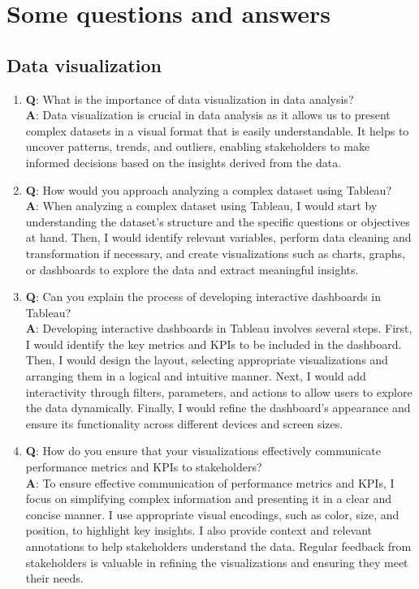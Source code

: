 \chapter{Some questions and answers}

\section{Data visualization}

\begin{enumerate}
	\item \textbf{Q}: What is the importance of data visualization in data analysis? \\
	\textbf{A}: Data visualization is crucial in data analysis as it allows us to present complex datasets in a visual format that is easily understandable. It helps to uncover patterns, trends, and outliers, enabling stakeholders to make informed decisions based on the insights derived from the data.
	
	\item \textbf{Q}: How would you approach analyzing a complex dataset using Tableau?\\
	\textbf{A}: When analyzing a complex dataset using Tableau, I would start by understanding the dataset's structure and the specific questions or objectives at hand. Then, I would identify relevant variables, perform data cleaning and transformation if necessary, and create visualizations such as charts, graphs, or dashboards to explore the data and extract meaningful insights.
	
	\item \textbf{Q}: Can you explain the process of developing interactive dashboards in Tableau? \\
	\textbf{A}: Developing interactive dashboards in Tableau involves several steps. First, I would identify the key metrics and KPIs to be included in the dashboard. Then, I would design the layout, selecting appropriate visualizations and arranging them in a logical and intuitive manner. Next, I would add interactivity through filters, parameters, and actions to allow users to explore the data dynamically. Finally, I would refine the dashboard's appearance and ensure its functionality across different devices and screen sizes.
	
	\item \textbf{Q}: How do you ensure that your visualizations effectively communicate performance metrics and KPIs to stakeholders? \\
	\textbf{A}: To ensure effective communication of performance metrics and KPIs, I focus on simplifying complex information and presenting it in a clear and concise manner. I use appropriate visual encodings, such as color, size, and position, to highlight key insights. I also provide context and relevant annotations to help stakeholders understand the data. Regular feedback from stakeholders is valuable in refining the visualizations and ensuring they meet their needs.
	

\end{enumerate}

